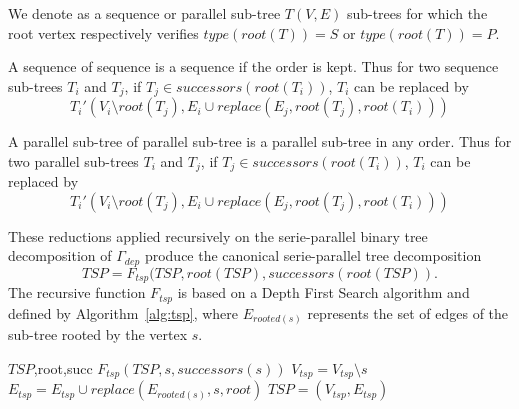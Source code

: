 \begin{mydef}
We denote as a sequence or parallel sub-tree $T(V,E)$ sub-trees for which the root vertex respectively verifies $type(root(T))=S$ or $type(root(T))=P$.
\end{mydef}

\begin{myth}
A sequence of sequence is a sequence if the order is kept. Thus for two sequence sub-trees $T_i$ and $T_j$, if $T_j \in successors(root(T_i))$, $T_i$ can be replaced by 
\begin{equation*}
T_i'(V_i \setminus root(T_j),E_i \cup replace(E_j,root(T_j),root(T_i)))
\end{equation*}
\end{myth}

\begin{myth}
A parallel sub-tree of parallel sub-tree is a parallel sub-tree in any order. Thus for two parallel sub-trees $T_i$ and $T_j$, if $T_j \in successors(root(T_i))$, $T_i$ can be replaced by 
\begin{equation*}
T_i'(V_i \setminus root(T_j),E_i \cup replace(E_j,root(T_j),root(T_i)))
\end{equation*}
\end{myth}

These reductions applied recursively on the serie-parallel binary tree decomposition of $\Gamma_{dep}$ produce the canonical serie-parallel tree decomposition 
\begin{equation*}
TSP = F_{tsp}(TSP,root(TSP),successors(root(TSP)).
\end{equation*}
The recursive function $F_{tsp}$ is based on a Depth First Search algorithm and defined by Algorithm~\ref{alg:tsp}, where $E_{rooted(s)}$ represents the set of edges of the sub-tree rooted by the vertex $s$.

\begin{algorithm}
\caption{$F_{tsp}$}
\label{alg:tsp}
\begin{algorithmic}[1]
 {$TSP$,root,succ}
\State $F_{tsp}(TSP,s,successors(s))$
\State $V_{tsp} = V_{tsp} \setminus s$
\State $E_{tsp} = E_{tsp} \cup replace(E_{rooted(s)},s,root)$
\State $TSP = (V_{tsp},E_{tsp})$
\EndIf
\EndIf
\EndFor
\EndProcedure
\end{algorithmic}
\end{algorithm}

